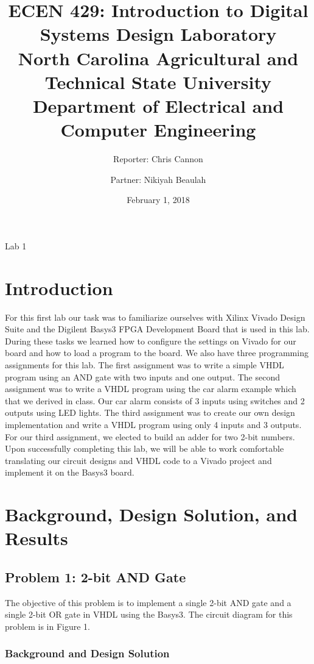 \documentclass[11pt]{article}
\title {ECEN 429: Introduction to Digital Systems Design Laboratory \\ North Carolina Agricultural and Technical State University \\ Department of Electrical and Computer Engineering} %
\author{Reporter: Chris Cannon \\ \and Partner: Nikiyah Beaulah} %
\date{February 1, 2018}
\begin{document}
\maketitle %

\begin{center}
Lab	1
\end{center}

\pagebreak

\section{Introduction}
For this first lab our task was to familiarize ourselves with Xilinx Vivado Design Suite and the Digilent Basys3 FPGA Development Board that is used in this lab. During these tasks we learned how to configure the settings on Vivado for our board and how to load a program to the board. We also have three programming assignments for this lab. The first assignment was to write a simple VHDL program using an AND gate with two inputs and one output. The second assignment was to write a VHDL program using the car alarm example which that we derived in class. Our car alarm consists of 3 inputs using switches and 2 outputs using LED lights.  The third assignment was to create our own design implementation and write a VHDL program using only 4 inputs and 3 outputs. For our third assignment, we elected to build an adder for two 2-bit numbers. Upon successfully completing this lab, we will be able to work comfortable translating our circuit designs and VHDL code to a Vivado project and implement it on the Basys3 board.

\section{Background, Design Solution, and Results}
\subsection{Problem 1: 2-bit AND Gate}
The objective of this problem is to implement a single 2-bit AND gate and a single 2-bit OR gate in VHDL using the Basys3. The circuit diagram for this problem is in Figure 1.

\subsubsection{Background and Design Solution}
\end{document}
